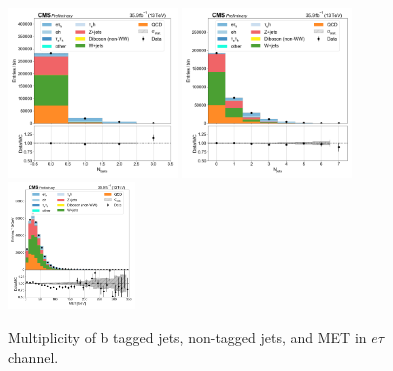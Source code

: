 \begin{figure}[htb!]
    \centering
    \includegraphics[width=0.4\textwidth]{chapters/Analysis/sectionPlots/figures/data_mc_overlays/etau_2016_inclusive_linear_jet_n_bjets}
    \includegraphics[width=0.4\textwidth]{chapters/Analysis/sectionPlots/figures/data_mc_overlays/etau_2016_inclusive_linear_jet_n_jets}
    \includegraphics[width=0.3\textwidth]{chapters/Analysis/sectionPlots/figures/data_mc_overlays/etau_2016_inclusive_linear_misc_met_mag}
    \caption{Multiplicity of b tagged jets, non-tagged jets, and MET in
        $e\tau$ channel.}
    \label{fig:analysis:plots:etau_jetmet}
\end{figure}

